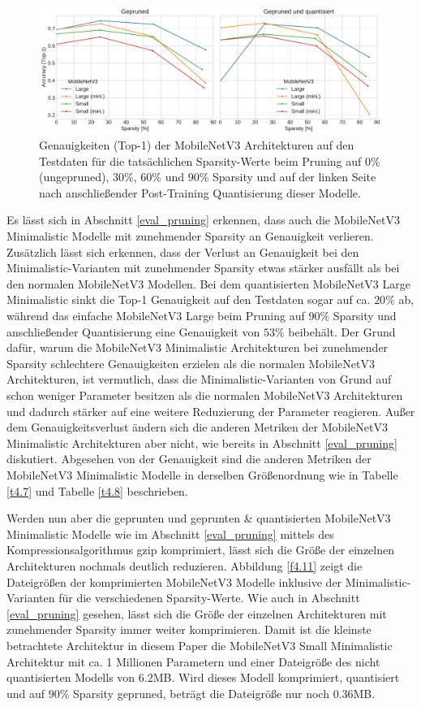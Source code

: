 \begin{figure}[htbp]
\centerline{\includegraphics[width=\textwidth]{content/images/sparsity_vs_accuracy_mnv3mini.pdf}}
\caption{Genauigkeiten (Top-1) der MobileNetV3 Architekturen auf den Testdaten für die tatsächlichen Sparsity-Werte beim Pruning auf $0\%$ (ungepruned), $30\%$, $60\%$ und $90\%$ Sparsity und auf der linken Seite nach anschließender Post-Training Quantisierung dieser Modelle.}
\label{f4.10}
\end{figure}

Es lässt sich in Abschnitt \ref{eval_pruning} erkennen, dass auch die MobileNetV3 Minimalistic Modelle mit zunehmender Sparsity an Genauigkeit verlieren. Zusätzlich lässt sich erkennen, dass der Verlust an Genauigkeit bei den Minimalistic-Varianten mit zunehmender Sparsity etwas stärker ausfällt als bei den normalen MobileNetV3 Modellen. Bei dem quantisierten MobileNetV3 Large Minimalistic sinkt die Top-1 Genauigkeit auf den Testdaten sogar auf ca. $20\%$ ab, während das einfache MobileNetV3 Large beim Pruning auf $90\%$ Sparsity und anschließender Quantisierung eine Genauigkeit von $53\%$ beibehält. Der Grund dafür, warum die MobileNetV3 Minimalistic Architekturen bei zunehmender Sparsity schlechtere Genauigkeiten erzielen als die normalen MobileNetV3 Architekturen, ist vermutlich, dass die Minimalistic-Varianten von Grund auf schon weniger Parameter besitzen als die normalen MobileNetV3 Architekturen und dadurch stärker auf eine weitere Reduzierung der Parameter reagieren. Außer dem Genauigkeitsverlust ändern sich die anderen Metriken der MobileNetV3 Minimalistic Architekturen aber nicht, wie bereits in Abschnitt \ref{eval_pruning} diskutiert. Abgesehen von der Genauigkeit sind die anderen Metriken der MobileNetV3 Minimalistic Modelle in derselben Größenordnung wie in Tabelle \ref{t4.7} und Tabelle \ref{t4.8} beschrieben.

Werden nun aber die geprunten und geprunten \& quantisierten MobileNetV3 Minimalistic Modelle wie im Abschnitt \ref{eval_pruning} mittels des Kompressionsalgorithmus gzip komprimiert, lässt sich die Größe der einzelnen Architekturen nochmals deutlich reduzieren. Abbildung \ref{f4.11} zeigt die Dateigrößen der komprimierten MobileNetV3 Modelle inklusive der Minimalistic-Varianten für die verschiedenen Sparsity-Werte. Wie auch in Abschnitt \ref{eval_pruning} gesehen, lässt sich die Größe der einzelnen Architekturen mit zunehmender Sparsity immer weiter komprimieren. Damit ist die kleinste betrachtete Architektur in diesem Paper die MobileNetV3 Small Minimalistic Architektur mit ca. 1 Millionen Parametern und einer Dateigröße des nicht quantisierten Modells von 6.2MB. Wird dieses Modell komprimiert, quantisiert und auf $90\%$ Sparsity gepruned, beträgt die Dateigröße nur noch 0.36MB.

